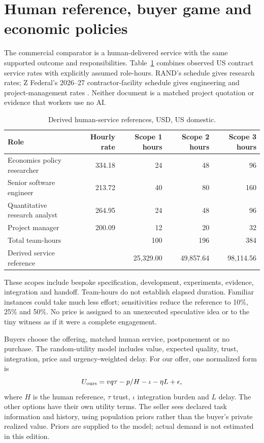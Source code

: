 \documentclass[11pt,letterpaper]{article}
\begin{document}
\section{Human reference, buyer game and economic policies}

The commercial comparator is a human-delivered service with the same supported
outcome and responsibilities. Table~\ref{tab:human} combines observed US
contract service rates with explicitly assumed role-hours. RAND's schedule gives
research rates; Z Federal's 2026--27 contractor-facility schedule gives engineering
and project-management rates \citep{rand-rates,zfed-rates}. Neither document is
a matched project quotation or evidence that workers use no AI.

\begin{table}[H]\centering\small
\caption{Derived human-service references, USD, US domestic.}\label{tab:human}
\begin{tabular}{lrrrr}\toprule
Role & Hourly rate & Scope 1 hours & Scope 2 hours & Scope 3 hours\\\midrule
Economics policy researcher & 334.18 & 24 & 48 & 96\\
Senior software engineer & 213.72 & 40 & 80 & 160\\
Quantitative research analyst & 264.95 & 24 & 48 & 96\\
Project manager & 200.09 & 12 & 20 & 32\\\midrule
Total team-hours & & 100 & 196 & 384\\
Derived service reference & & 25,329.00 & 49,857.64 & 98,114.56\\\bottomrule
\end{tabular}
\end{table}

These scopes include bespoke specification, development, experiments, evidence,
integration and handoff. Team-hours do not establish elapsed duration. Familiar
instances could take much less effort; sensitivities reduce the reference to
10\%, 25\% and 50\%. No price is assigned to an unexecuted speculative idea or
to the tiny witness as if it were a complete engagement.

Buyers choose the offering, matched human service, postponement or no purchase.
The random-utility model includes value, expected quality, trust, integration,
price and urgency-weighted delay. For our offer, one normalized form is
\begin{equation}
U_{\rm ours}=v q\tau-p/H-\iota-\eta L+\epsilon,
\end{equation}
where $H$ is the human reference, $\tau$ trust, $\iota$ integration burden and $L$
delay. The other options have their own utility terms. The seller sees declared
task information and history, using population priors rather than the buyer's
private realized value. Priors are supplied to the model; actual demand is not
estimated in this edition.
\end{document}
